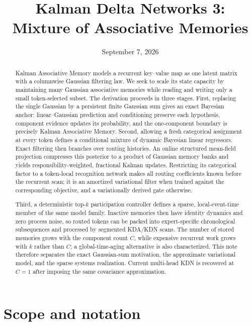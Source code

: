 \documentclass[11pt]{article}
\title{Kalman Delta Networks 3:\\
Mixture of Associative Memories}
\author{}
\date{September 7, 2026}
\begin{document}
\maketitle

\begin{abstract}
Kalman Associative Memory models a recurrent key--value map as one latent matrix with a
columnwise Gaussian filtering law.  We seek to scale its state capacity by maintaining many
Gaussian associative memories while reading and writing only a small token-selected subset.  The
derivation proceeds in three stages.  First, replacing the single Gaussian by a persistent finite
Gaussian sum gives an exact Bayesian anchor: linear--Gaussian prediction and conditioning preserve
each hypothesis, component evidence updates its probability, and the one-component boundary is
precisely Kalman Associative Memory.  Second, allowing a fresh categorical assignment at every
token defines a conditional mixture of dynamic Bayesian linear regressors.  Exact filtering then
branches over routing histories.  An online structured mean-field projection compresses this
posterior to a product of Gaussian memory banks and yields responsibility-weighted, fractional
Kalman updates.  Restricting its categorical factor to a token-local recognition network makes all
routing coefficients known before the recurrent scan; it is an amortized variational filter when
trained against the corresponding objective, and a variationally derived gate otherwise.

Third, a deterministic top-$k$ participation controller defines a sparse, local-event-time member
of the same model family.  Inactive memories then have identity dynamics and zero process noise,
so routed tokens can be packed into
expert-specific chronological subsequences and processed by segmented KDA/KDN scans.  The number
of stored memories grows with the component count $C$, while expensive recurrent work grows with
$k$ rather than $C$; a global-time-aging alternative is also characterized.  This note therefore
separates the exact Gaussian-sum motivation, the approximate variational model, and the sparse
systems realization.  Current multi-head KDN is recovered at $C=1$ after imposing the same
covariance approximation.
\end{abstract}

\section{Scope and notation}
\label{sec:kdn3-scope}
\end{document}
